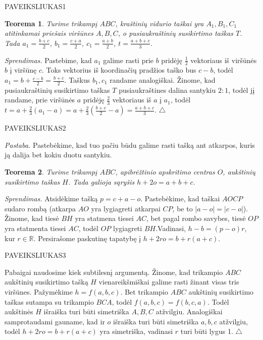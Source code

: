\documentclass[11pt,a4paper,twoside]{book}
\newenvironment{sprendimas}{\noindent \textit{Sprendimas.}}{\hfill $\triangle$}
\newtheorem{thmnr}{Teorema}
\theoremstyle{definition} \newtheorem*{api}{Apibrėžimas}
\theoremstyle{remark} \newtheorem*{pastaba}{Pastaba}
\begin{document}
PAVEIKSLIUKAS1

\begin{thmnr}
Turime trikampį $ABC$, kraštinių vidurio taškai yra $A_1, B_1, C_1$ atitinkamai priešais viršūnes $A, B, C$, o pusiaukraštinių susikirtimo taškas $T$. Tada
$a_1 = \frac{b+c}{2}$,
$b_1 = \frac{c+a}{2}$,
$c_1 = \frac{a+b}{2}$,
$t = \frac{a+b+c}{3}$.
\end{thmnr}
\begin{sprendimas}
Pastebime, kad $a_1$ galime rasti prie $b$ pridėję $\frac{1}{2}$ vektoriaus iš viršūnės $b$ į viršūnę $c$. Toks vektorius iš koordinačių pradžios taško bus $c-b$, todėl $a_1 = b + \frac{c-b}{2}=\frac{b+c}{2}$. Taškus $b_1, c_1$ randame analogiškai.
Žinome, kad pusiaukraštinių susikirtimo taškas $T$ pusiaukraštines dalina santykiu $2:1$, todėl jį randame, prie viršūnės $a$ pridėję $\frac{2}{3}$ vektoriaus iš $a$ į $a_1$, todėl $t=a+\frac{2}{3}(a_1-a)=a+\frac{2}{3}(\frac{b+c}{2}-a)=\frac{a+b+c}{3}$.
\end{sprendimas}

PAVEIKSLIUKAS2

\textit {Pastaba.} Pastebėkime, kad tuo pačiu būdu galime rasti tašką ant atkarpos, kuris ją dalija bet kokiu duotu santykiu.



\begin{thmnr}
Turime trikampį $ABC$, apibrėžtinio apskritimo centras $O$, aukštinių susikirtimo taškas $H$. Tada galioja sąryšis
$h + 2o = a + b + c$.
\end{thmnr}
\begin{sprendimas}
Atsidėkime tašką $p=c+a-o$. Pastebėkime, kad taškai $AOCP$ sudaro rombą (atkarpa $AO$ yra lygiagreti atkarpai $CP$, be to $|a-o|=|c-o|$). Žinome, kad tiesė $BH$ yra statmena tiesei $AC$, bet pagal rombo savybes, tiesė $OP$ yra statmenta tiesei $AC$, todėl $OP$ lygiagreti $BH$.Vadinasi, $h-b=(p-o)r$, kur $r \in \mathbb{R}$. Persirašome paskutinę tapatybę į $h+2ro=b+r(a+c)$.

PAVEIKSLIUKAS3

Pabaigai naudosime kiek subtilesnį argumentą. Žinome, kad trikampio $ABC$ aukštinių susikirtimo tašką $H$ vienareikšmiškai galime rasti žinant visas tris viršūnes. Pažymėkime $h=f(a, b,c)$. Bet trikampio $ABC$ aukštinių susikirtimo taškas sutampa su trikampio $BCA$, todėl $f(a, b,c)=f(b,c,a)$. Todėl aukštinės $H$ išraiška turi būti simetriška $A, B, C$ atžvilgiu. Analogiškai samprotaudami gauname, kad ir $o$ išraiška turi būti simetriška $a, b, c$ atžvilgiu, todėl $h+2ro=b+r(a+c)$ yra simetriška, vadinasi $r$ turi būti lygus 1.
\end{sprendimas}
\end{document}
